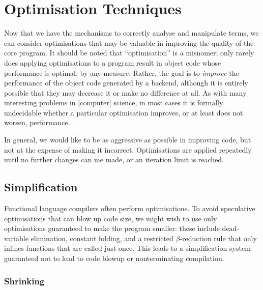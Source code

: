 

\section{Optimisation Techniques}

Now that we have the mechanisms to correctly analyse and manipulate terms, we
can consider optimisations that may be valuable in improving the quality of the
core program. It should be noted that ``optimisation'' is a misnomer; only
rarely does applying optimisations to a program result in object code whose
performance is optimal, by any measure. Rather, the goal is to \emph{improve}
the performance of the object code generated by a backend, although it is
entirely possible that they may decrease it or make no difference at all. As
with many interesting problems in [computer] science, in most cases it is
formally undecidable whether a particular optimisation improves, or at least
does not worsen, performance.

In general, we would like to be as aggressive as possible in improving code, but
not at the expense of making it incorrect. Optimisations are applied repeatedly
until no further changes can me made, or an iteration limit is reached.


\subsection{Simplification}

Functional language compilers often perform optimisations. To avoid speculative
optimisations that can blow up code size, we might wish to use only
optimisations guaranteed to make the program smaller: these include
dead-variable elimination, constant folding, and a restricted $\beta$-reduction
rule that only inlines functions that are called just once. This leads to a
simplification system guaranteed not to lead to code blowup or nonterminating
compilation.

\subsubsection{Shrinking}

